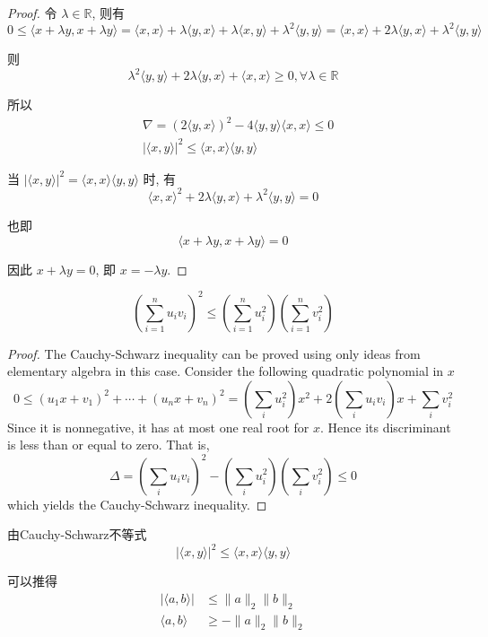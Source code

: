 \begin{proof}
    令 $\lambda \in \mathbb{R}$, 则有 
    $$0 \leq\langle x+\lambda y, x+\lambda y\rangle=\langle x, x\rangle+\lambda\langle y, x\rangle+\lambda\langle x, y\rangle+\lambda^{2}\langle y, y\rangle=\langle x, x\rangle+2 \lambda\langle y, x\rangle+\lambda^{2}\langle y, y\rangle$$

则 
$$\lambda^{2}\langle y, y\rangle+2 \lambda\langle y, x\rangle+\langle x, x\rangle \geq 0, \forall \lambda \in \mathbb{R}$$

所以
$$
\begin{aligned}
&\nabla=(2\langle y, x\rangle)^{2}-4\langle y, y\rangle\langle x, x\rangle \leq 0 \\
&|\langle x, y\rangle|^{2} \leq\langle x, x\rangle\langle y, y\rangle
\end{aligned}
$$

当 $|\langle x, y\rangle|^{2}=\langle x, x\rangle\langle y, y\rangle$ 时, 有 $$\langle x, x\rangle^{2}+2 \lambda\langle y, x\rangle+\lambda^{2}\langle y, y\rangle=0$$

也即 $$\langle x+\lambda y, x+\lambda y\rangle=0$$

因此 $x+\lambda y=0$, 即 $x=-\lambda y$.
\end{proof}

\begin{theorem}

    $$\left(\sum_{i=1}^{n} u_{i} v_{i}\right)^{2} \leq\left(\sum_{i=1}^{n} u_{i}^{2}\right)\left(\sum_{i=1}^{n} v_{i}^{2}\right)$$
\end{theorem}

\begin{proof}
    The Cauchy-Schwarz inequality can be proved using only ideas from elementary algebra in this case. Consider the following quadratic polynomial in $x$
$$
0 \leq\left(u_{1} x+v_{1}\right)^{2}+\cdots+\left(u_{n} x+v_{n}\right)^{2}=\left(\sum_{i} u_{i}^{2}\right) x^{2}+2\left(\sum_{i} u_{i} v_{i}\right) x+\sum_{i} v_{i}^{2}
$$
Since it is nonnegative, it has at most one real root for $x$. Hence its discriminant is less than or equal to zero. That is,
$$
\Delta = \left(\sum_{i} u_{i} v_{i}\right)^{2}-\left(\sum_{i} u_{i}^{2}\right)\left(\sum_{i} v_{i}^{2}\right) \leq 0
$$
which yields the Cauchy-Schwarz inequality.
\end{proof}

\begin{corollary}
    由Cauchy-Schwarz不等式
    $$
    |\langle x, y\rangle|^{2} \leq\langle x, x\rangle\langle y, y\rangle
    $$

    可以推得
    $$\begin{aligned}
        |\langle a,b \rangle| &\le \| a \|_2 \| b \|_2\\
        \langle a,b \rangle &\ge -\| a \|_2 \| b \|_2
    \end{aligned} $$
\end{corollary}


